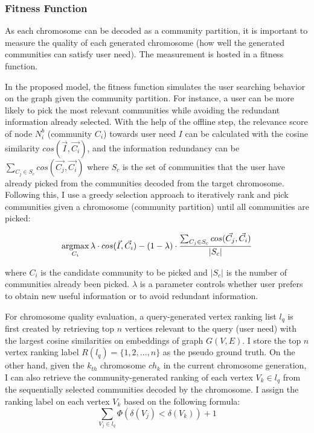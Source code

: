 \subsubsection{Fitness Function} 

As each chromosome can be decoded as a community partition, it is important to measure the quality of each generated chromosome (how well the generated communities can satisfy user need). The measurement is hosted in a fitness function. 


In the proposed model, the fitness function simulates the user searching behavior on the graph given the community partition. For instance, a user can be more likely to pick the most relevant communities while avoiding the redundant information already selected. With the help of the offline step, the relevance score of node $N_{i}^{b}$ (community $C_{i}$) towards user need $I$ can be calculated with the cosine similarity $cos(\vec{I},\vec{C_{i}})$, and the information redundancy can be $\sum_{C_{j} \in S_c}cos(\vec{C_{j}},\vec{C_{i}})$ where $S_{c}$ is the set of communities that the user have already picked from the communities decoded from the target chromosome. Following this, I use a greedy selection approach to iteratively rank and pick communities given a chromosome (community partition) until all communities are picked: 

\begin{equation}  \operatorname*{argmax}_{C_{i}}\lambda \cdot cos(\vec{I},\vec{C_{i}})-(1-\lambda)\cdot \frac{\sum_{C_{j} \in S_c}^{ }cos( \vec{C_j},\vec{C_{i}})}{|S_c|}
\end{equation} 

where $C_i$ is the candidate community to be picked and $|S_c|$ is the number of communities already been picked. $\lambda$ is a parameter controls  whether user prefers to obtain new useful information or to avoid redundant information.  

For chromosome quality evaluation, a query-generated vertex ranking list $l_{q}$ is first created by retrieving top $n$ vertices relevant to the query (user need) with the largest cosine similarities on embeddings of graph $G(V,E)$. I store the top $n$ vertex ranking label $R(l_{q})=\{1,2,...,n\}$ as the pseudo ground truth. On the other hand, given the $k_{th}$ chromosome $ch_k$ in the current chromosome generation, I can also retrieve the community-generated ranking of each vertex $V_{k} \in l_{q}$ from the sequentially selected communities decoded by the chromosome. I assign the ranking label on each vertex $V_{k}$ based on the following formula:
\begin{equation}
\sum_{V_{j} \in l_{q}}\Phi(\delta(V_{j}) < \delta(V_{k})) + 1
\end{equation} 

